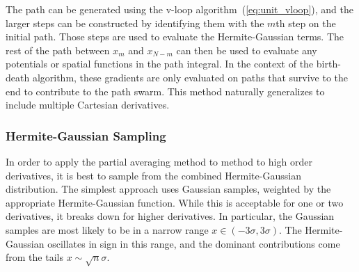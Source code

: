 The path can be generated using the v-loop algorithm~(\ref{eq:unit_vloop}), and the larger 
steps can be constructed by identifying them with the $m$th step on the initial path.  Those
steps are used to evaluate the Hermite-Gaussian terms.   
The rest of the path between $x_m$ and $x_{N-m}$ can then be used to evaluate any potentials or spatial
functions in the path integral.  
In the context of the birth-death algorithm, these gradients are only evaluated on paths that survive 
to the end to contribute to the path swarm.  
This method naturally generalizes to include multiple Cartesian derivatives.  


\subsubsection{Hermite-Gaussian Sampling}

In order to apply the partial averaging method to method to high order derivatives, 
it is best to sample from the combined Hermite-Gaussian distribution.
The simplest approach uses Gaussian samples, weighted by the appropriate Hermite-Gaussian function.
While this is acceptable for one or two derivatives, it breaks down for higher derivatives.
In particular, the Gaussian samples are most likely to be in a narrow range $x\in(-3\sigma,3\sigma)$.
The Hermite-Gaussian oscillates in sign in this range, and
the dominant contributions come from the tails $x\sim \sqrt{n}\sigma$.

